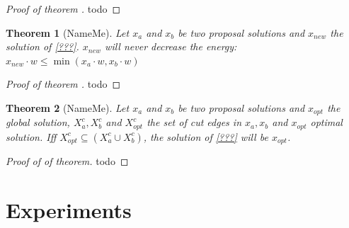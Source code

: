 \documentclass[10pt,twocolumn,letterpaper]{article}
\newtheorem{theorem}{Theorem}
\begin{document}
\begin{proof}[Proof of theorem ]
todo
\end{proof}



\begin{theorem}[NameMe]
Let $x_{a}$ and $x_{b}$ be two proposal solutions and  $x_{new}$ the solution of \ref{???}.
$x_{new}$  will never decrease the energy:
$x_{new} \cdot w \leq  \min( x_{a}\cdot w,  x_{b}\cdot w) $ 
\end{theorem}

\begin{proof}[Proof of theorem ]
todo
\end{proof}



\begin{theorem}[NameMe]

Let $x_{a}$ and $x_{b}$ be two proposal solutions and  $x_{opt}$ the global solution,
$X_{a}^c, X_{b}^c$ and $ X_{opt}^c$ the set of cut edges in  $x_{a}, x_{b}$  and $ x_{opt}$
optimal solution.
Iff  $ X_{opt}^c \subseteq  (X_{a}^c \cup X_{b}^c)$,  the solution of \ref{???} will be $x_{opt}$.
\end{theorem}

\begin{proof}[Proof of of theorem]
todo
\end{proof}


\section{Experiments}
\end{document}
